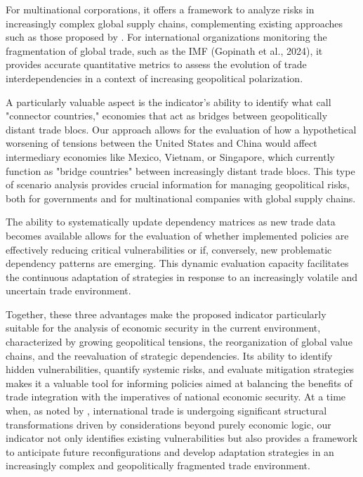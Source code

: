 \documentclass[final,1p,times,authoryear]{elsarticle}
\begin{document}
For multinational corporations, it offers a framework to analyze risks in increasingly complex global supply chains, complementing existing approaches such as those proposed by \citet{StollThethi2022}. For international organizations monitoring the fragmentation of global trade, such as the IMF (Gopinath et al., 2024), it provides accurate quantitative metrics to assess the evolution of trade interdependencies in a context of increasing geopolitical polarization.

A particularly valuable aspect is the indicator's ability to identify what \citet{Gopinath2024} call "connector countries," economies that act as bridges between geopolitically distant trade blocs. Our approach allows for the evaluation of how a hypothetical worsening of tensions between the United States and China would affect intermediary economies like Mexico, Vietnam, or Singapore, which currently function as "bridge countries" between increasingly distant trade blocs. This type of scenario analysis provides crucial information for managing geopolitical risks, both for governments and for multinational companies with global supply chains.

The ability to systematically update dependency matrices as new trade data becomes available allows for the evaluation of whether implemented policies are effectively reducing critical vulnerabilities or if, conversely, new problematic dependency patterns are emerging. This dynamic evaluation capacity facilitates the continuous adaptation of strategies in response to an increasingly volatile and uncertain trade environment.

Together, these three advantages make the proposed indicator particularly suitable for the analysis of economic security in the current environment, characterized by growing geopolitical tensions, the reorganization of global value chains, and the reevaluation of strategic dependencies. Its ability to identify hidden vulnerabilities, quantify systemic risks, and evaluate mitigation strategies makes it a valuable tool for informing policies aimed at balancing the benefits of trade integration with the imperatives of national economic security. At a time when, as noted by \citet{Gopinath2024}, international trade is undergoing significant structural transformations driven by considerations beyond purely economic logic, our indicator not only identifies existing vulnerabilities but also provides a framework to anticipate future reconfigurations and develop adaptation strategies in an increasingly complex and geopolitically fragmented trade environment.
\end{document}
